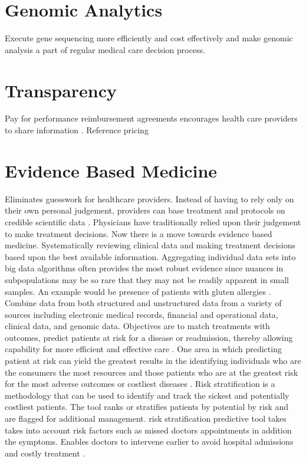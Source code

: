 \documentclass[sigconf]{acmart}
\begin{document}
\section{Genomic Analytics}
Execute gene sequencing more efficiently and cost effectively and make genomic analysis a part of regular medical care decision process. 

\section{Transparency}
Pay for performance reimbursement agreements encourages health care providers to share information \cite{www-google-christian}.
Reference pricing
\section{Evidence Based Medicine}
Eliminates guesswork for healthcare providers. Instead of having to rely only on their own personal judgement, providers can base treatment and protocols on credible scientific data \cite{www-google-christian}.
Physicians have traditionally relied upon their judgement to make treatment decisions. Now there is a move towards evidence based medicine. Systematically reviewing clinical data and making treatment decisions based upon the best available information.  Aggregating individual data sets into big data algorithms often provides the most robust evidence since nuances in subpopulations may be so rare that they may not be readily apparent in small samples. An example would be presence of patients with gluten allergies \cite{www-google-McKinsey}.
Combine data from both structured and unstructured data from a variety of sources including electronic medical records, financial and operational data, clinical data, and genomic data. Objectives are to match treatments with outcomes, predict patients at risk for a disease or readmission, thereby allowing capability for more efficient and effective care \cite{springer}.
One area in which predicting patient at risk can yield the greatest results in the identifying individuals who are the consumers the most resources and those patients who are at the greatest risk for the most adverse outcomes or costliest diseases \cite{springer}. 
Risk stratification is a methodology that can be used to identify and track the sickest and potentially costliest patients. The tool ranks or stratifies patients by potential by risk and are flagged for additional management. risk stratification predictive tool takes takes into account risk factors such as missed doctors appointments in addition the symptoms. Enables doctors to intervene earlier to avoid hospital admissions and costly treatment \cite{datafloq}. 
\end{document}
